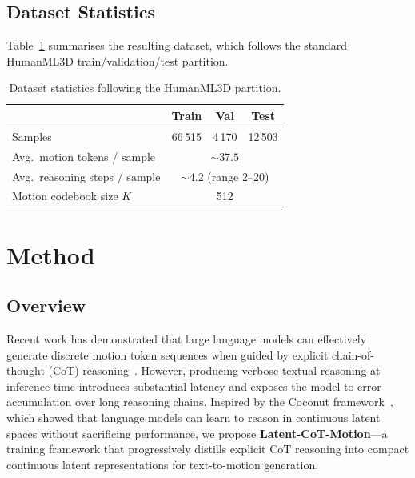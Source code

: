 \subsection{Dataset Statistics}

Table~\ref{tab:dataset_stats} summarises the resulting dataset, which
follows the standard HumanML3D train/validation/test partition.

\begin{table}[t]
\centering
\caption{Dataset statistics following the HumanML3D partition.}
\label{tab:dataset_stats}
\setlength{\tabcolsep}{8pt}
\begin{tabular}{lccc}
\toprule
 & Train & Val & Test \\
\midrule
Samples & 66\,515 & 4\,170 & 12\,503 \\
Avg.\ motion tokens / sample & \multicolumn{3}{c}{${\sim}37.5$} \\
Avg.\ reasoning steps / sample & \multicolumn{3}{c}{${\sim}4.2$ (range 2--20)} \\
Motion codebook size $K$ & \multicolumn{3}{c}{512} \\
\bottomrule
\end{tabular}
\end{table}


\section{Method}
\label{sec:method}

\subsection{Overview}

Recent work has demonstrated that large language models can effectively
generate discrete motion token sequences when guided by explicit
chain-of-thought (CoT) reasoning~\cite{zhang2023generating}.
However, producing verbose textual reasoning at inference time introduces
substantial latency and exposes the model to error accumulation over long
reasoning chains.
Inspired by the Coconut framework~\cite{hao2024training}, which showed
that language models can learn to reason in continuous latent spaces
without sacrificing performance, we propose \textbf{Latent-CoT-Motion}---a
training framework that progressively distills explicit CoT reasoning into
compact continuous latent representations for text-to-motion generation.

